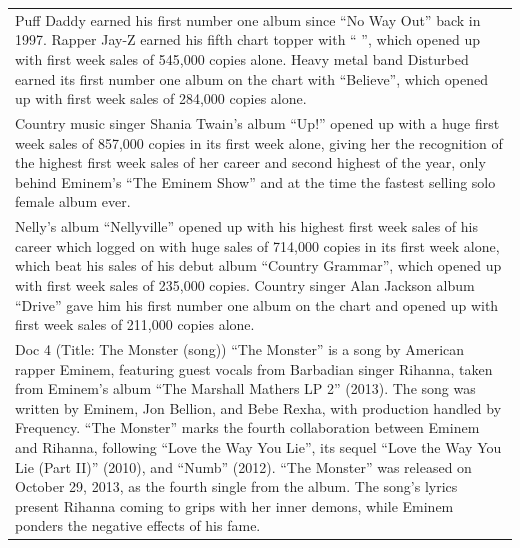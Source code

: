 \documentclass[11pt]{article}
\begin{document}
\begin{longtable}{|p{}|}
Puff Daddy earned his first number one album since ``No Way Out'' back in 1997. Rapper Jay-Z earned his fifth chart topper with `` '', which opened up with first week sales of 545,000 copies alone. Heavy metal band Disturbed earned its first number one album on the chart with ``Believe'', which opened up with first week sales of 284,000 copies alone. \\
Country music singer Shania Twain's album ``Up!'' opened up with a huge first week sales of 857,000 copies in its first week alone, giving her the recognition of the highest first week sales of her career and second highest of the year, only behind Eminem's ``The Eminem Show'' and at the time the fastest selling solo female album ever. \\
Nelly's album ``Nellyville'' opened up with his highest first week sales of his career which logged on with huge sales of 714,000 copies in its first week alone, which beat his sales of his debut album ``Country Grammar'', which opened up with first week sales of 235,000 copies. Country singer Alan Jackson album ``Drive'' gave him his first number one album on the chart and opened up with first week sales of 211,000 copies alone. \\
Doc 4 (Title: The Monster (song)) ``The Monster'' is a song by American rapper Eminem, featuring guest vocals from Barbadian singer Rihanna, taken from Eminem's album ``The Marshall Mathers LP 2'' (2013). The song was written by Eminem, Jon Bellion, and Bebe Rexha, with production handled by Frequency. ``The Monster'' marks the fourth collaboration between Eminem and Rihanna, following ``Love the Way You Lie'', its sequel ``Love the Way You Lie (Part II)'' (2010), and ``Numb'' (2012). ``The Monster'' was released on October 29, 2013, as the fourth single from the album. The song's lyrics present Rihanna coming to grips with her inner demons, while Eminem ponders the negative effects of his fame. \\

\end{longtable}
\end{document}
